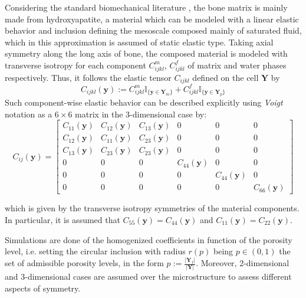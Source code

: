 Considering the standard biomechanical literature \cite{Foiret2014}, the bone matrix is mainly made from hydroxyapatite, a material which can be modeled with a linear elastic behavior and inclusion defining the mesoscale composed mainly of saturated fluid, which in this approximation is assumed of static elastic type. Taking axial symmetry along the long axis of bone, the composed material is modeled with transverse isotropy for each component $C^m_{ijkl}$, $C^f_{ijkl}$ of matrix and water phases respectively.
Thus, it follows the elastic tensor $C_{ijkl}$ defined on the cell $\mathbf{Y}$ by
\begin{equation*}
    C_{ijkl} (\mathbf{y}) := C^m_{ijkl} \mathbb{I}_{\{\mathbf{y} \in  \mathbf{Y}_{m}\}} + C^f_{ijkl} \mathbb{I}_{\{ \mathbf{y} \in \mathbf{Y}_{p}\}}
\end{equation*}
Such component-wise elastic behavior can be described explicitly using \textit{Voigt} notation as a $6\times 6$ matrix in the 3-dimensional case by:
\begin{equation*}
    C_{ij}(\mathbf{y}) = 
    \begin{bmatrix}
    C_{11}(\mathbf{y}) & C_{12}(\mathbf{y}) & C_{13}(\mathbf{y}) & 0 & 0 & 0 \\
    C_{12}(\mathbf{y}) & C_{11}(\mathbf{y}) & C_{23}(\mathbf{y}) & 0 & 0 & 0 \\
    C_{13}(\mathbf{y}) & C_{23}(\mathbf{y}) & C_{23}(\mathbf{y}) & 0 & 0 & 0 \\
    0 & 0 & 0 & C_{44}(\mathbf{y}) & 0 & 0 \\
    0 & 0 & 0 & 0 & C_{44}(\mathbf{y}) & 0 \\
    0 & 0 & 0 & 0 & 0 & C_{66}(\mathbf{y}) 
    \end{bmatrix}
\end{equation*}

which is given by the transverse isotropy symmetries of the material components. In particular, it is assumed that $C_{55}(\mathbf{y}) = C_{44}(\mathbf{y})$ and $C_{11}(\mathbf{y}) = C_{22}(\mathbf{y})$.

Simulations are done of the homogenized coefficients in function of the porosity level, i.e. setting the circular inclusion with radius $r(p)$ being $p \in (0,1)$ the set of admissible porosity levels, in the form $ p := \frac{\vert \mathbf{Y}_f \vert }{\vert \mathbf{Y}\vert} $. Moreover, 2-dimensional and 3-dimensional cases are assumed over the microstructure to assess different aspects of symmetry.

